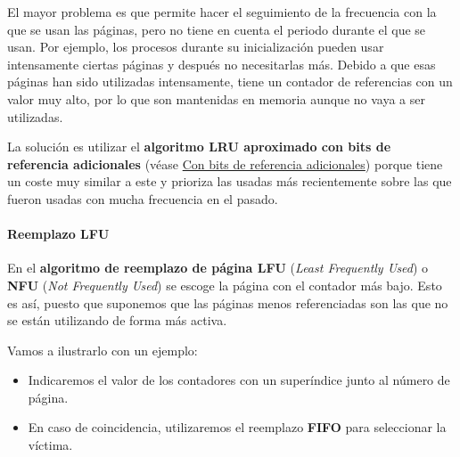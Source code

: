 El mayor problema es que permite hacer el seguimiento de la frecuencia
con la que se usan las páginas, pero no tiene en cuenta el periodo
durante el que se usan. Por ejemplo, los procesos durante su
inicialización pueden usar intensamente ciertas páginas y después no
necesitarlas más. Debido a que esas páginas han sido utilizadas
intensamente, tiene un contador de referencias con un valor muy alto,
por lo que son mantenidas en memoria aunque no vaya a ser utilizadas.

La solución es utilizar el \textbf{algoritmo LRU aproximado con bits de
referencia adicionales} (véase
\hyperref[_con_bits_de_referencia_adicionales]{Con bits de referencia
adicionales}) porque tiene un coste muy similar a este y prioriza las
usadas más recientemente sobre las que fueron usadas con mucha
frecuencia en el pasado.

\paragraph{Reemplazo LFU}\label{_reemplazo_lfu}

{} {} {} {} En el \textbf{algoritmo de reemplazo de página {}LFU}
(\emph{Least Frequently Used}) o \textbf{{}NFU} (\emph{Not Frequently
Used}) se escoge la página con el contador más bajo. Esto es así, puesto
que suponemos que las páginas menos referenciadas son las que no se
están utilizando de forma más activa.

Vamos a ilustrarlo con un ejemplo:

\begin{itemize}
\item
  Indicaremos el valor de los contadores con un superíndice junto al
  número de página.
\item
  En caso de coincidencia, utilizaremos el reemplazo \textbf{FIFO} para
  seleccionar la víctima.
\end{itemize}

